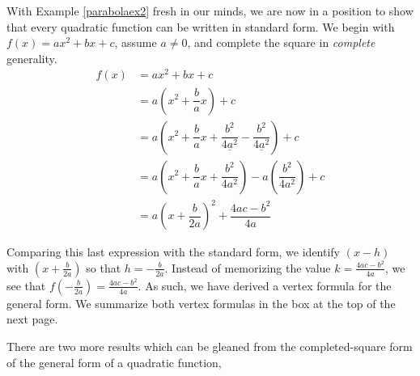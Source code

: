 \medskip

With Example \ref{parabolaex2} fresh in our minds, we are now in a position to show that every quadratic function can be written in standard form.  We begin with $f(x) = ax^2+bx+c$, assume $a \neq 0$, and complete the square in \textit{complete} generality. 
\begin{align*}
f(x) & =  ax^2 + bx + c  \\
& =  a\left(x^2 + \dfrac{b}{a} x\right) + c  \tag*{(Factor out coefficient of $x^2$ from $x^2$ and $x$.)} \\
& =   a\left(x^2 + \dfrac{b}{a} x + \underline{\dfrac{b^{2}}{4a^2}} - \underline{\dfrac{b^{2}}{4a^2}} \right) + c   \\[3pt]
& =   a\left(x^2 + \dfrac{b}{a} x + \dfrac{b^{2}}{4a^2} \right)  - a \left(\dfrac{b^{2}}{4a^2}\right) + c   \tag*{(Group the perfect square trinomial.)} \\[3pt] 
& =  a\left(x+\dfrac{b}{2a}\right)^2 + \dfrac{4ac - b^2}{4a}  \tag*{(Factor and get a common denominator.)}
\end{align*}

Comparing this last expression with the standard form, we identify $(x-h)$ with $\left(x+\frac{b}{2a}\right)$ so that $h = -\frac{b}{2a}$. Instead of memorizing the value $k = \frac{4ac - b^2}{4a}$, we see that $f\left(-\frac{b}{2a}\right) = \frac{4ac - b^2}{4a}$.  As such, we have derived a vertex formula for the general form.  We summarize both vertex formulas in the box at the top of the next page. 


\smallskip


\smallskip

There are two more results which can be gleaned from the completed-square form of the general form of a quadratic function,

